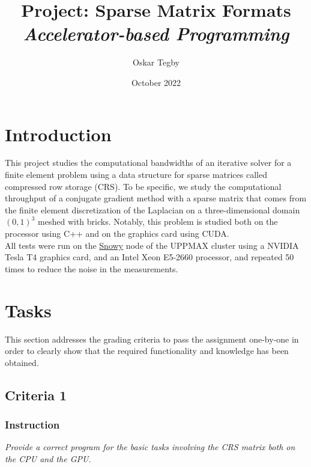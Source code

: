 \documentclass[10pt]{article}
\title{Project: Sparse Matrix Formats \\ \large \textit{Accelerator-based Programming}}
\author{Oskar Tegby}
\date{October 2022}
\begin{document}
\maketitle


\section{Introduction}
This project studies the computational bandwidths of an iterative solver for a finite element problem using a data structure for sparse matrices called compressed row storage (CRS). To be specific, we study the computational throughput of a conjugate gradient method with a sparse matrix that comes from the finite element discretization of the Laplacian on a three-dimensional domain $(0,1)^3$ meshed with bricks. Notably, this problem is studied both on the processor using C++ and on the graphics card using CUDA. \\

All tests were run on the \href{https://www.uppmax.uu.se/resources/systems/the-snowy-cluster/}{Snowy} node of the UPPMAX cluster using a NVIDIA Tesla T4 graphics card, and an Intel Xeon E5-2660 processor, and repeated 50 times to reduce the noise in the measurements.

\section{Tasks}
This section addresses the grading criteria to pass the assignment one-by-one in order to clearly show that the required functionality and knowledge has been obtained.
\subsection{Criteria 1}
\subsubsection{Instruction}
\textit{Provide a correct program for the basic tasks involving the CRS matrix both on the CPU and the GPU.}
\end{document}

